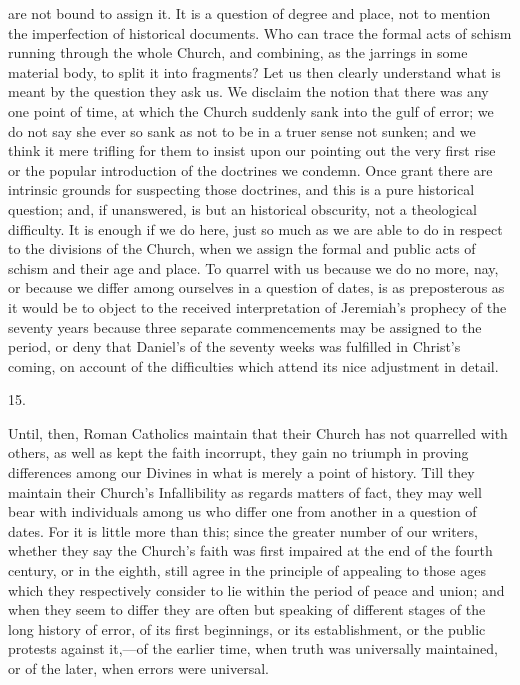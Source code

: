 are not bound to assign it. It is a question of degree and place, not
to mention the imperfection of historical documents. Who can trace the
formal acts of schism running through the whole Church, and combining,
as the jarrings in some material body, to split it into fragments? Let
us then clearly understand what is meant by the question they ask us.
We disclaim the notion that there was any one point of time, at which
the Church suddenly sank into the gulf of error; we do not say she
ever so sank as not to be in a truer sense not sunken; and we think it
mere trifling for them to insist upon our pointing out the very first
rise or the popular introduction of the doctrines we condemn. Once
grant there are intrinsic grounds for suspecting those doctrines, and
this is a pure historical question; and, if unanswered, is but an
historical obscurity, not a theological difficulty. It is enough if we
do here, just so much as we are able to do in respect to the divisions
of the Church, when we assign the formal and public acts of schism and
their age and place. To quarrel with us because we do no more, nay, or
because we differ among ourselves in a question of dates, is as
preposterous as it would be to object to the received interpretation
of Jeremiah's prophecy of the seventy years because three
separate commencements may be assigned to the period, or deny that
Daniel's of the seventy weeks was fulfilled in Christ's coming, on
account of the difficulties which attend its nice adjustment in
detail.

15.

Until, then, Roman Catholics maintain that their Church has not
quarrelled with others, as well as kept the faith incorrupt, they gain
no triumph in proving differences among our Divines in what is merely
a point of history. Till they maintain their Church's Infallibility as
regards matters of fact, they may well bear with individuals among us
who differ one from another in a question of dates. For it is little
more than this; since the greater number of our writers, whether they
say the Church's faith was first impaired at the end of the fourth
century, or in the eighth, still agree in the principle of appealing
to those ages which they respectively consider to lie within the
period of peace and union; and when they seem to differ they are often
but speaking of different stages of the long history of error, of its
first beginnings, or its establishment, or the public protests against
it,—of the earlier time, when truth was universally maintained, or
of the later, when errors were universal.

